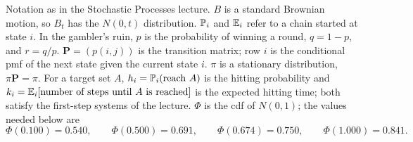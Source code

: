 \providecommand{\Var}{\operatorname{Var}}
\providecommand{\Cov}{\operatorname{Cov}}
\providecommand{\PP}{\mathbf{P}}
\providecommand{\st}[1]{\mathsf{#1}}

\noindent Notation as in the Stochastic Processes lecture. $B$ is a standard Brownian motion, so $B_t$ has the $N(0,t)$ distribution. $\mathbb{P}_i$ and $\mathbb{E}_i$ refer to a chain started at state $i$. In the gambler's ruin, $p$ is the probability of winning a round, $q=1-p$, and $r=q/p$. $\PP=(p(i,j))$ is the transition matrix; row $i$ is the conditional pmf of the next state given the current state $i$. $\pi$ is a stationary distribution, $\pi\PP=\pi$. For a target set $A$, $h_i=\mathbb{P}_i(\text{reach }A)$ is the hitting probability and $k_i=\mathbb{E}_i[\text{number of steps until }A\text{ is reached}]$ is the expected hitting time; both satisfy the first-step systems of the lecture. $\Phi$ is the cdf of $N(0,1)$; the values needed below are
\[
\Phi(0.100)=0.540,\qquad\Phi(0.500)=0.691,\qquad\Phi(0.674)=0.750,\qquad\Phi(1.000)=0.841.
\]

